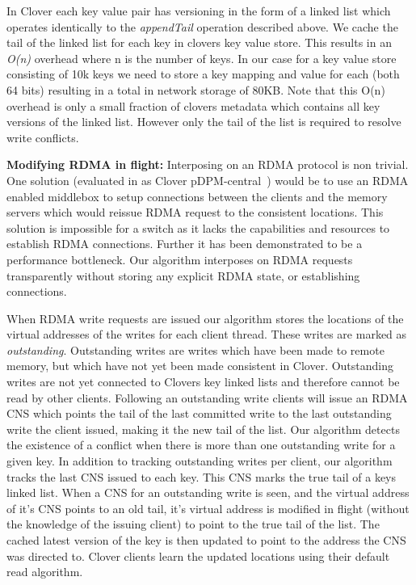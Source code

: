 In Clover each key value pair has versioning in the form of a linked
list which operates identically to the \textit{appendTail} operation
described above. We cache the tail of the linked list for each key in
clovers key value store. This results in an \textit{O(n)} overhead
where n is the number of keys. In our case for a key value store
consisting of 10k keys we need to store a key mapping and value for
each (both 64 bits) resulting in a total in network storage of 80KB.
Note that this O(n) overhead is only a small fraction of clovers
metadata which contains all key versions of the linked list. However
only the tail of the list is required to resolve write conflicts.

\textbf{Modifying RDMA in flight:} Interposing on an RDMA protocol is
non trivial. One solution (evaluated in as Clover
pDPM-central~\cite{clover}) would be to use an RDMA enabled middlebox
to setup connections between the clients and the memory servers which
would reissue RDMA request to the consistent locations. This solution
is impossible for a switch as it lacks the capabilities and resources
to establish RDMA connections. Further it has been demonstrated to be
a performance bottleneck. Our algorithm interposes on RDMA requests
transparently without storing any explicit RDMA state, or establishing
connections.

When RDMA write requests are issued our algorithm stores the locations
of the virtual addresses of the writes for each client thread. These
writes are marked as \textit{outstanding}. Outstanding writes are
writes which have been made to remote memory, but which have not yet
been made consistent in Clover. Outstanding writes are not yet
connected to Clovers key linked lists and therefore cannot be read by
other clients. Following an outstanding write clients will issue an
RDMA CNS which points the tail of the last committed write to the last
outstanding write the client issued, making it the new tail of the
list. Our algorithm detects the existence of a conflict when there is
more than one outstanding write for a given key. In addition to
tracking outstanding writes per client, our algorithm tracks the last
CNS issued to each key. This CNS marks the true tail of a keys linked
list. When a CNS for an outstanding write is seen, and the virtual
address of it's CNS points to an old tail, it's virtual address is
modified in flight (without the knowledge of the issuing client) to
point to the true tail of the list. The cached latest version of the
key is then updated to point to the address the CNS was directed to.
Clover clients learn the updated locations using their default read
algorithm.

